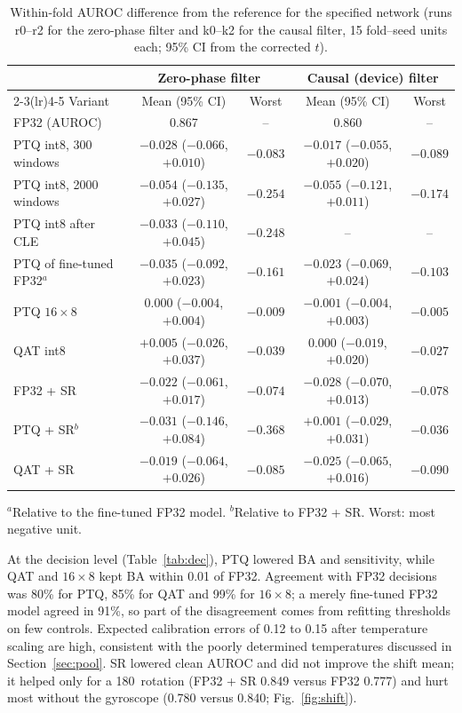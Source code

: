 \documentclass[preprint,12pt]{elsarticle}
\begin{document}
\begin{table}[!t]
\caption{Within-fold AUROC difference from the reference for the specified network (runs r0--r2 for the zero-phase filter and k0--k2 for the causal filter, 15 fold--seed units each; 95\% CI from the corrected $t$).}
\label{tab:quant}
\centering\scriptsize
\setlength{\tabcolsep}{2.5pt}
\begin{tabular*}{\linewidth}{@{\extracolsep{\fill}}lcccc@{}}
\toprule
 & \multicolumn{2}{c}{Zero-phase filter} & \multicolumn{2}{c}{Causal (device) filter} \\
\cmidrule(lr){2-3}\cmidrule(lr){4-5}
Variant & Mean (95\% CI) & Worst & Mean (95\% CI) & Worst \\
\midrule
FP32 (AUROC) & 0.867 & -- & 0.860 & -- \\
PTQ int8, 300 windows & $-0.028$ ($-0.066$, $+0.010$) & $-0.083$ & $-0.017$ ($-0.055$, $+0.020$) & $-0.089$ \\
PTQ int8, 2000 windows & $-0.054$ ($-0.135$, $+0.027$) & $-0.254$ & $-0.055$ ($-0.121$, $+0.011$) & $-0.174$ \\
PTQ int8 after CLE & $-0.033$ ($-0.110$, $+0.045$) & $-0.248$ & -- & -- \\
PTQ of fine-tuned FP32$^{a}$ & $-0.035$ ($-0.092$, $+0.023$) & $-0.161$ & $-0.023$ ($-0.069$, $+0.024$) & $-0.103$ \\
PTQ $16\times8$ & $0.000$ ($-0.004$, $+0.004$) & $-0.009$ & $-0.001$ ($-0.004$, $+0.003$) & $-0.005$ \\
QAT int8 & $+0.005$ ($-0.026$, $+0.037$) & $-0.039$ & $0.000$ ($-0.019$, $+0.020$) & $-0.027$ \\
FP32 + SR & $-0.022$ ($-0.061$, $+0.017$) & $-0.074$ & $-0.028$ ($-0.070$, $+0.013$) & $-0.078$ \\
PTQ + SR$^{b}$ & $-0.031$ ($-0.146$, $+0.084$) & $-0.368$ & $+0.001$ ($-0.029$, $+0.031$) & $-0.036$ \\
QAT + SR & $-0.019$ ($-0.064$, $+0.026$) & $-0.085$ & $-0.025$ ($-0.065$, $+0.016$) & $-0.090$ \\
\bottomrule
\end{tabular*}

\vspace{2pt}\parbox{\linewidth}{\footnotesize $^{a}$Relative to the fine-tuned FP32 model. $^{b}$Relative to FP32 + SR. Worst: most negative unit.}
\end{table}

At the decision level (Table~\ref{tab:dec}), PTQ lowered BA and sensitivity, while QAT and $16\times8$ kept BA within 0.01 of FP32. Agreement with FP32 decisions was 80\% for PTQ, 85\% for QAT and 99\% for $16\times8$; a merely fine-tuned FP32 model agreed in 91\%, so part of the disagreement comes from refitting thresholds on few controls. Expected calibration errors of 0.12 to 0.15 after temperature scaling are high, consistent with the poorly determined temperatures discussed in Section~\ref{sec:pool}. SR lowered clean AUROC and did not improve the shift mean; it helped only for a 180\textdegree\ rotation (FP32 + SR 0.849 versus FP32 0.777) and hurt most without the gyroscope (0.780 versus 0.840; Fig.~\ref{fig:shift}).
\end{document}
